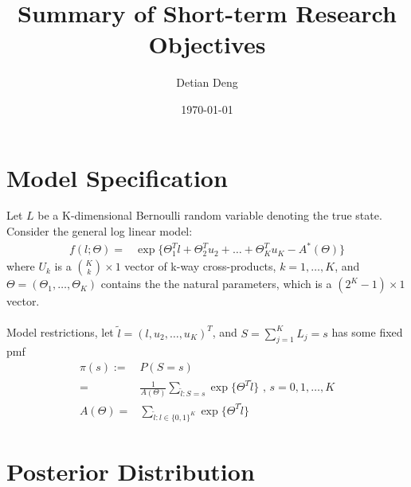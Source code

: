 \documentclass[11 pt, a4paper]{article}  %
\begin{document}
\title{Summary of Short-term Research Objectives}   %
\author{Detian Deng}         %
\date{\today}    %
\maketitle


\section{Model Specification}             %
Let $L$ be a K-dimensional Bernoulli random variable denoting the true state.
Consider the general log linear model:
\begin{align*}
f(l; \Theta) = & \exp \{\Theta_1^T l + \Theta_2^{T} u_2 + \ldots + \Theta_K^T u_K - A^*(\Theta)\}
\end{align*}
where $U_k$ is a ${K \choose k} \times 1$ vector of k-way cross-products, $k = 1,\ldots,K$,  and $\Theta = (\Theta_1,\ldots, \Theta_K)$ contains the the natural parameters, which is a $(2^K-1) \times 1$ vector.\\
\ \\
Model restrictions, let $\tilde{l} = (l,u_2,\dots,u_K)^T$, and $S = \sum_{j=1}^K L_j = s$ has some fixed pmf 
\begin{align}
\pi(s) := & P(S=s)\nonumber \\ 
= & \frac{1}{A(\Theta)} \sum_{\tilde{l}:S=s}\exp \{ \Theta^T \tilde{l}\}  \text{ , } s = 0,1,\ldots, K \\
A(\Theta) = & \sum_{\tilde{l}:l\in \{0,1\}^K}\exp \{ \Theta^T \tilde{l}\}
\end{align}


\newpage
\section{Posterior Distribution}
\end{document}
